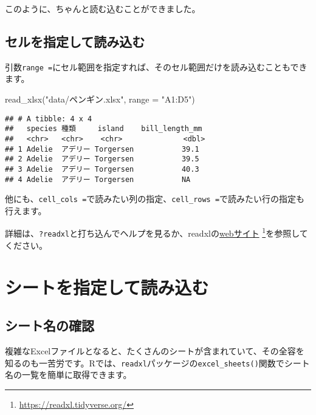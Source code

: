 \documentclass[
  xelatex,ja=standard, b5paper]{bxjsbook}
\newenvironment{Shaded}{\begin{snugshade}}{\end{snugshade}}
\newcommand{\AttributeTok}[1]{\textcolor[rgb]{0.77,0.63,0.00}{#1}}
\newcommand{\FunctionTok}[1]{\textcolor[rgb]{0.00,0.00,0.00}{#1}}
\newcommand{\NormalTok}[1]{#1}
\newcommand{\StringTok}[1]{\textcolor[rgb]{0.31,0.60,0.02}{#1}}
\begin{document}
このように、ちゃんと読む込むことができました。

\hypertarget{ux30bbux30ebux3092ux6307ux5b9aux3057ux3066ux8aadux307fux8fbcux3080}{%
\subsection{セルを指定して読み込む}\label{ux30bbux30ebux3092ux6307ux5b9aux3057ux3066ux8aadux307fux8fbcux3080}}

引数\texttt{range\ =}にセル範囲を指定すれば、そのセル範囲だけを読み込むこともできます。

\begin{Shaded}
\begin{Highlighting}[]
\FunctionTok{read\_xlsx}\NormalTok{(}\StringTok{"data/ペンギン.xlsx"}\NormalTok{, }\AttributeTok{range =} \StringTok{"A1:D5"}\NormalTok{)}
\end{Highlighting}
\end{Shaded}

\begin{verbatim}
## # A tibble: 4 x 4
##   species 種類     island    bill_length_mm
##   <chr>   <chr>    <chr>              <dbl>
## 1 Adelie  アデリー Torgersen           39.1
## 2 Adelie  アデリー Torgersen           39.5
## 3 Adelie  アデリー Torgersen           40.3
## 4 Adelie  アデリー Torgersen           NA
\end{verbatim}

他にも、\texttt{cell\_cols\ =}で読みたい列の指定、\texttt{cell\_rows\ =}で読みたい行の指定も行えます。

詳細は、\texttt{?readxl}と打ち込んでヘルプを見るか、readxlの\href{https://readxl.tidyverse.org/}{webサイト} \footnote{\url{https://readxl.tidyverse.org/}}を参照してください。

\hypertarget{ux30b7ux30fcux30c8ux3092ux6307ux5b9aux3057ux3066ux8aadux307fux8fbcux3080}{%
\section{シートを指定して読み込む}\label{ux30b7ux30fcux30c8ux3092ux6307ux5b9aux3057ux3066ux8aadux307fux8fbcux3080}}

\hypertarget{ux30b7ux30fcux30c8ux540dux306eux78baux8a8d}{%
\subsection{シート名の確認}\label{ux30b7ux30fcux30c8ux540dux306eux78baux8a8d}}

複雑なExcelファイルとなると、たくさんのシートが含まれていて、その全容を知るのも一苦労です。Rでは、\texttt{readxl}パッケージの\texttt{excel\_sheets()}関数でシート名の一覧を簡単に取得できます。
\end{document}
